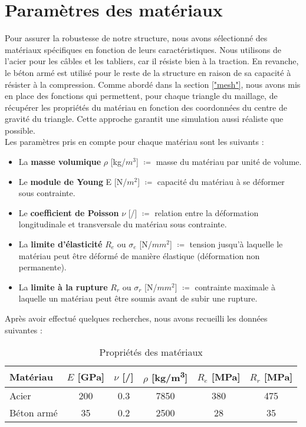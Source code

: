 \documentclass{article}
\begin{document}
\section{Paramètres des matériaux}
\label{"materials"}
Pour assurer la robustesse de notre structure, nous avons sélectionné des matériaux spécifiques en fonction de leurs caractéristiques. Nous utilisons de l'acier pour les câbles et les tabliers, car il résiste bien à la traction. En revanche, le béton armé est utilisé pour le reste de la structure en raison de sa capacité à résister à la compression. Comme abordé dans la section \ref{"mesh"}, nous avons mis en place des fonctions qui permettent, pour chaque triangle du maillage, de récupérer les propriétés du matériau en fonction des coordonnées du centre de gravité du triangle. Cette approche garantit une simulation aussi réaliste que possible. \\

Les paramètres pris en compte pour chaque matériau sont les suivants :
\begin{itemize}
    \item La \textbf{masse volumique} $\rho$ [kg/$m^3$] $\coloneqq$ masse du matériau par unité de volume.
    \item Le \textbf{module de Young} E [N/$m^2$] $\coloneqq$ capacité du matériau à se déformer sous contrainte.
    \item Le \textbf{coefficient de Poisson} $\nu$ [/] $\coloneqq$ relation entre la déformation longitudinale et transversale du matériau sous contrainte.
    \item La \textbf{limite d'élasticité} $R_e$ ou $\sigma_e$ [N/$mm^2$] $\coloneqq$ tension jusqu'à laquelle le matériau peut être déformé de manière élastique (déformation non permanente).
    \item La \textbf{limite à la rupture} $R_r$ ou $\sigma_r$ [N/$mm^2$] $\coloneqq$ contrainte maximale à laquelle un matériau peut être soumis avant de subir une rupture. \\
\end{itemize}

Après avoir effectué quelques recherches, nous avons recueilli les données suivantes :
\begin{table}[htbp]
    \centering
    \caption{Propriétés des matériaux}
    \begin{tabular}{l|ccccc}
        \toprule
        Matériau & $E$ [GPa] & $\nu$ [/] & $\rho$ [kg/m\textsuperscript{3}] & $R_e$ [MPa] & $R_r$ [MPa] \\
        \midrule
        Acier & 200 & 0.3 & 7850 & 380 & 475 \\
        Béton armé & 35 & 0.2 & 2500 & 28 & 35\\
        \bottomrule
    \end{tabular}
    \label{tab:proprietes_materiaux}
\end{table}
\end{document}
